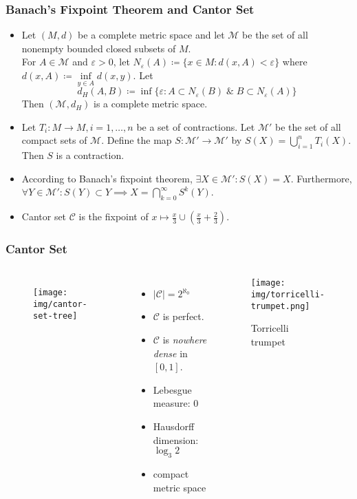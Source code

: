 \documentclass[UTF8,aspectratio=43,11pt,colorlinks,compress,openany]{beamer}%
\begin{document}
\begin{frame}\frametitle{Banach's Fixpoint Theorem and Cantor Set}
	\begin{itemize}
		\item Let $(M,d)$ be a complete metric space and let $\mathcal{M}$ be the set of all nonempty bounded closed subsets of $M$.\\
		For $A\in\mathcal{M}$ and $\varepsilon>0$, let $N_\varepsilon(A)\coloneqq \big\{x\in M: d(x,A)<\varepsilon\big\}$ where $d(x,A)\coloneqq \inf\limits_{y\in A}d(x,y)$. Let \[d_H(A,B)\coloneqq \inf\big\{\varepsilon: A\subset N_\varepsilon(B)\;\&\;B\subset N_\varepsilon(A)\big\}\]
		Then $(\mathcal{M},d_H)$ is a complete metric space.
		\item Let $T_i: M\to M, i=1,\dots,n$ be a set of contractions. Let $\mathcal{M}'$ be the set of all compact sets of $\mathcal{M}$. Define the map $S:\mathcal{M}'\to\mathcal{M}'$ by $S(X)=\bigcup\limits_{i=1}^n T_i(X)$.
		Then $S$ is a contraction.
		\item According to Banach's fixpoint theorem, $\exists X\in\mathcal{M}': S(X)=X$. Furthermore, $\forall Y\in\mathcal{M}': S(Y)\subset Y\implies X=\bigcap\limits_{k=0}^\infty S^k(Y)$.
		\item Cantor set $\mathcal{C}$ is the fixpoint of $x\mapsto\frac{x}{3}\cup\left(\frac{x}{3}+\frac{2}{3}\right)$.
	\end{itemize}
\end{frame}

\begin{frame}\frametitle{Cantor Set}\vspace{-2ex}
	\begin{columns}
			\begin{figure}
				\texttt{[image: img/cantor-set-tree]}
			\end{figure}
			\vspace{-12pt}
			\begin{itemize}
				\item $|\mathcal{C}|=2^{\aleph_0}$
				\item $\mathcal{C}$ is perfect.
				\item $\mathcal{C}$ is \emph{nowhere dense} in $[0,1]$.
				\item Lebesgue measure: $0$
				\item Hausdorff dimension: $\log_3 2$
				\item compact metric space
			\end{itemize}
			\begin{center}
				\begin{figure}
					\texttt{[image: img/torricelli-trumpet.png]}\vspace{-4ex}\caption{Torricelli trumpet}
				\end{figure}
			\end{center}
	\end{columns}
\end{frame}
\end{document}
